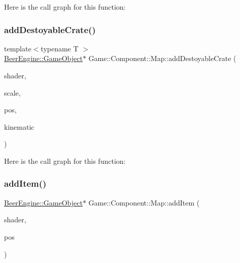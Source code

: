 Here is the call graph for this function\+:
\mbox{\label{class_game_1_1_component_1_1_map_ab7d5bd531fc73fa3c4697e6d7fd909f2}} 
\subsubsection{\texorpdfstring{add\+Destoyable\+Crate()}{addDestoyableCrate()}}
{\footnotesize\ttfamily template$<$typename T $>$ \\
\mbox{\hyperlink{class_beer_engine_1_1_game_object}{Beer\+Engine\+::\+Game\+Object}}$\ast$ Game\+::\+Component\+::\+Map\+::add\+Destoyable\+Crate (\begin{DoxyParamCaption}\item[{\mbox{\hyperlink{class_beer_engine_1_1_graphics_1_1_shader_program}{Beer\+Engine\+::\+Graphics\+::\+Shader\+Program}} $\ast$}]{shader,  }\item[{glm\+::vec3}]{scale,  }\item[{glm\+::vec3}]{pos,  }\item[{\mbox{\hyperlink{namespace_beer_engine_1_1_component_a2cfe279cc309b6420e792597940b8a33}{Beer\+Engine\+::\+Component\+::\+R\+B\+Type}}}]{kinematic }\end{DoxyParamCaption})\hspace{0.3cm}{\ttfamily [inline]}}

Here is the call graph for this function\+:
\mbox{\label{class_game_1_1_component_1_1_map_ace1a6fc80c32206aea8ffc382a30e879}} 
\subsubsection{\texorpdfstring{add\+Item()}{addItem()}}
{\footnotesize\ttfamily \mbox{\hyperlink{class_beer_engine_1_1_game_object}{Beer\+Engine\+::\+Game\+Object}}$\ast$ Game\+::\+Component\+::\+Map\+::add\+Item (\begin{DoxyParamCaption}\item[{\mbox{\hyperlink{class_beer_engine_1_1_graphics_1_1_shader_program}{Beer\+Engine\+::\+Graphics\+::\+Shader\+Program}} $\ast$}]{shader,  }\item[{glm\+::vec3}]{pos }\end{DoxyParamCaption})}

